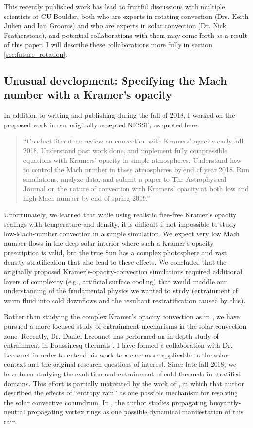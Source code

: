\documentclass[aasms,12pt]{article}
\begin{document}
This recently published work has lead to fruitful discussions with multiple scientists at
CU Boulder, both who are experts in rotating convection (Drs. Keith Julien and Ian Grooms)
and who are experts in solar convection (Dr. Nick Featherstone), and potential collaborations
with them may come forth as a result of this paper. I will describe these collaborations
more fully in section \ref{sec:future_rotation}.

\subsection{Unusual development: Specifying the Mach number with a Kramer's opacity}
\label{sec:thermals}
In addition to writing and publishing \citet{anders&all2019} during the fall of 2018, I 
worked on the proposed work in our originally accepted NESSF, as quoted here:

\begin{quote}
``Conduct literature review on convection with Kramers' opacity early fall 2018.  
Understand past work done, and implement fully compressible equations with Kramers'
opacity in simple atmospheres.  Understand how to control the Mach number in these
atmospheres by end of year 2018.  Run simulations, analyze data, and submit a paper to The Astrophysical Journal
on the nature of convection with Kramers' opacity at both low and high Mach number by
end of spring 2019.''
\end{quote}

Unfortunately, we learned that while using realistic free-free Kramer's opacity scalings with
temperature and density, it is difficult if not impossible to study low-Mach-number convection
in a simple simulation. We expect very low Mach number flows in the deep solar interior where
such a Kramer's opacity prescription is valid, but the true Sun has a complex photosphere and
vast density stratification that also lead to these effects. We concluded that the originally
proposed Kramer's-opacity-convection simulations required additional layers of complexity 
(e.g., artificial surface cooling) that would muddle our understanding of the fundamental
physics we wanted to study (entrainment of warm fluid into cold downflows and the resultant
restratification caused by this).

Rather than studying the complex Kramer's opacity convection as in \citet{kapyla&all2017},
we have pursued a more focused study of entrainment mechanisms in the solar convection zone.
Recently, Dr. Daniel Lecoanet has performed an in-depth study of entrainment in Boussinesq
thermals \citep[][in review]{lecoanet&jevanjee2018}. I have formed a collaboration with 
Dr. Lecoanet in order to extend his work to a case more applicable to the solar context and
the original research questions of interest. Since late fall 2018, we have been studying
the evolution and entrainment of cold thermals in stratified domains. This effort is partially
motivated by the work of \citet{brandenburg2016}, in which that author described the effects
of ``entropy rain'' as one possible mechanism for resolving the solar convective conundrum.
In \citet{brandenburt2016}, the author studies propagating buoyantly-neutral propagating
vortex rings as one possible dynamical manifestation of this rain.
\end{document}
